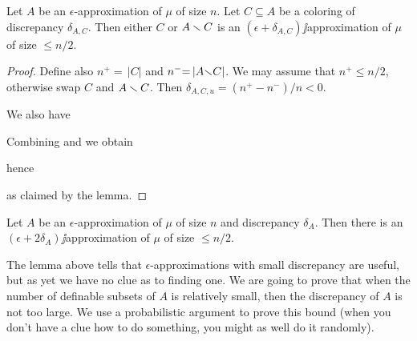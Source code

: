 \documentclass[combinatorics.tex]{subfiles}
\begin{document}
\begin{lemma}\label{lem_aprossimazionediapprossimazione}
Let $A$ be an $\epsilon$-approximation of $\mu$ of size $n$.
Let $C\subseteq A$ be a coloring of discrepancy $\delta_{A,C}$.
Then either $C$ or $A\smallsetminus C$ is an $(\epsilon+\delta_{A,C})\jj$approximation of $\mu$ of size $\le n/2$.
\end{lemma}

\begin{proof}

Define also $n^+{=}\,|C|$ and  $n^-{=}\,|A{\smallsetminus}C|$.
We may assume that $n^+\le n/2$, otherwise swap $C$ and $A\smallsetminus C$.
Then $\delta_{A,C,u}=(n^+-n^-)/n<0$.




We also have 




Combining  and  we obtain\smallskip

\smallskip

hence\smallskip

\smallskip

as claimed by the lemma.
\end{proof}

\begin{corollary}
Let $A$ be an $\epsilon$-approximation of $\mu$ of size $n$ and discrepancy $\delta_A$.
Then there is an $(\epsilon+2\delta_A)\jj$approximation of $\mu$ of size $\le n/2$.
\end{corollary}

The lemma above tells that $\epsilon$-approximations with small discrepancy are useful, but as yet we have no clue as to finding one.
We are going to prove that when the number of definable subsets of $A$ is relatively small, then the discrepancy of $A$ is not too large.
We use a probabilistic argument to prove this bound (when you don't have a clue how to do something, you might as well do it randomly).
\end{document}
